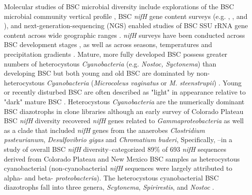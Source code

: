 Molecular studies of BSC microbial diversity include explorations of the BSC
microbial community vertical profile \citep{Garcia_Pichel_2003}, BSC
\textit{nifH} gene content surveys (e.g. \citet{14766579}, \citet{Yeager_2012},
\citet{Yeager} and \citet{Steppe_1996}), and next-generation-sequencing (NGS)
enabled studies of BSC SSU rRNA gene content across wide geographic ranges
\citep{Garcia_Pichel_2013, Steven_2013}. 
\textit{nifH} surveys have been conducted across BSC development stages
\citep{14766579}, as well as across seasons, temperatures and precipitation
gradients \citep{Yeager_2012}. Mature, more fully developed BSC possess greater
numbers of heterocystous \textit{Cyanobacteria} (e.g. \textit{Nostoc,
Syctonema}) than developing BSC but both young and old BSC are dominated by
non-heterocystous \textit{Cyanobacteria} (\textit{Microcoleus vaginatus} or
\textit{M. steenstrupii}) \citep{14766579, Garcia_Pichel_2013}. Young or
recently disturbed BSC are often described as "light" in appearance relative to
"dark" mature BSC \citep{Belnap_2002, 14766579}. Heterocystous
\textit{Cyanobacteria} are the numerically dominant BSC diazotrophs
\citep{Yeager, 14766579, Yeager_2012} in  clone libraries although
an early survey of Colorado Plateau BSC \textit{nifH} diversity recovered
\textit{nifH} genes related to \textit{Gammaproteobacteria} as well as a clade
that included \textit{nifH} genes from the anaerobes \textit{Clostridium
pssteurianum}, \textit{Desulfovibrio gigas} and \textit{Chromatium buderi},
Specifically, \citet{Yeager}--in a study of overall BSC \textit{nifH}
diversity--categorized 89\% of 693 \textit{nifH} sequences derived from
Colorado Plateau and New Mexico BSC samples as heterocystous cyanobacterial
(non-cyanobacterial \textit{nifH} sequences were largely attributed to alpha-
and beta- \textit{proteobacteria}). The heterocystous cyanobacterial BSC
diazotrophs fall into three genera, \textit{Scytonema}, \textit{Spirirestis},
and \textit{Nostoc} \citep{Yeager, Yeager_2012}. 

